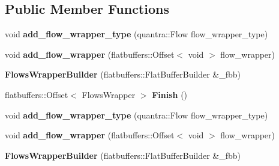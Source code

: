 \subsection*{Public Member Functions}
\begin{DoxyCompactItemize}
\item 
\mbox{\label{structquantra_1_1FlowsWrapperBuilder_ac88fc521bde3eb28fa78b7f1ff9902da}} 
void {\bfseries add\+\_\+flow\+\_\+wrapper\+\_\+type} (quantra\+::\+Flow flow\+\_\+wrapper\+\_\+type)
\item 
\mbox{\label{structquantra_1_1FlowsWrapperBuilder_adf8719e14aba6b9f2a24218fe0b662f9}} 
void {\bfseries add\+\_\+flow\+\_\+wrapper} (flatbuffers\+::\+Offset$<$ void $>$ flow\+\_\+wrapper)
\item 
\mbox{\label{structquantra_1_1FlowsWrapperBuilder_ae8823f486e0ed336bef2138f1f6b8119}} 
{\bfseries Flows\+Wrapper\+Builder} (flatbuffers\+::\+Flat\+Buffer\+Builder \&\+\_\+fbb)
\item 
\mbox{\label{structquantra_1_1FlowsWrapperBuilder_a966d0190ce307964791e62ab55bc49d3}} 
flatbuffers\+::\+Offset$<$ Flows\+Wrapper $>$ {\bfseries Finish} ()
\item 
\mbox{\label{structquantra_1_1FlowsWrapperBuilder_ac88fc521bde3eb28fa78b7f1ff9902da}} 
void {\bfseries add\+\_\+flow\+\_\+wrapper\+\_\+type} (quantra\+::\+Flow flow\+\_\+wrapper\+\_\+type)
\item 
\mbox{\label{structquantra_1_1FlowsWrapperBuilder_adf8719e14aba6b9f2a24218fe0b662f9}} 
void {\bfseries add\+\_\+flow\+\_\+wrapper} (flatbuffers\+::\+Offset$<$ void $>$ flow\+\_\+wrapper)
\item 
\mbox{\label{structquantra_1_1FlowsWrapperBuilder_ae8823f486e0ed336bef2138f1f6b8119}} 
{\bfseries Flows\+Wrapper\+Builder} (flatbuffers\+::\+Flat\+Buffer\+Builder \&\+\_\+fbb)
\item 
\mbox{\label{structquantra_1_1FlowsWrapperBuilder_a966d0190ce307964791e62ab55bc49d3}} 

\end{DoxyCompactItemize}
